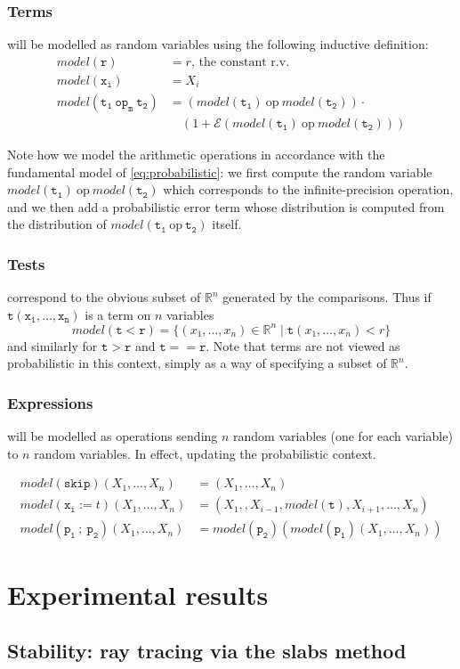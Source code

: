 \documentclass[10pt,conference]{IEEEtran}
\newcommand{\Err}{\mathcal{E}}
\newcommand{\R}{\mathbb{R}}
\newcommand{\mop}{~\mathtt{op_m}~}
\newcommand{\iop}{~\mathrm{op}~}
\begin{document}
\subsubsection{Terms} will be modelled as random variables using the following inductive definition:
\begin{align*}
model(\mathtt{r})&= r\text{, the constant r.v.}\\
model(\mathtt{x_i})&= X_i\\
model(\mathtt{t_1\mop t_2})&=\left(model(\mathtt{t_1})\iop model(\mathtt{t_2})\right)\cdot \\
& \hspace{12pt}\left(1+\Err(model(\mathtt{t_1})\iop model(\mathtt{t_2}))\right)
\end{align*}

Note how we model the arithmetic operations in accordance with the fundamental model of \cref{eq:probabilistic}: we first compute the random variable $model(\mathtt{t_1})\iop model(\mathtt{t_2})$ which corresponds to the infinite-precision operation, and we then add a probabilistic error term whose distribution is computed from the distribution of $model(\mathtt{t_1}\iop\mathtt{t_2})$ itself.

\subsubsection{Tests} correspond to the obvious subset of $\R^n$ generated by the comparisons. Thus if $\mathtt{t(x_1,\ldots,x_n)}$ is a term on $n$ variables 
\[
model(\mathtt{t<r})=\{(x_1,\ldots,x_n)\in\R^n\mid \mathtt{t}(x_1,\ldots,x_n)<r\}
\]
and similarly for $\mathtt{t>r}$ and $\mathtt{t==r}$. Note that terms are not viewed as probabilistic in this context, simply as a way of specifying a subset of $\R^n$.

\subsubsection{Expressions} will be modelled as operations sending $n$ random variables (one for each variable) to $n$ random variables. In effect, updating the probabilistic context.

\begin{align*}
model(\mathtt{skip})(X_1,\ldots,X_n)&=(X_1,\ldots,X_n)\\
model(\mathtt{x_i}:=t)(X_1,\ldots,X_n)&=(X_1,, X_{i-1},model(\mathtt{t}),X_{i+1},\ldots,X_n)\\
model(\mathtt{p_1~;~p_2})(X_1,\ldots,X_n)&=model(\mathtt{p_2})(model(\mathtt{p_1})(X_1,\ldots,X_n))
\end{align*}


\section{Experimental results}

\subsection{Stability: ray tracing via the slabs method}



\end{document}
